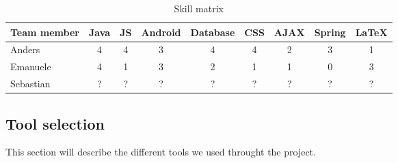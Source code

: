 \begin{table}[h]
\begin{center}
\begin{tabular}{ | l | c | c | c | c | c | c | c | c | }
  \hline
  Team member & Java & JS & Android & Database & CSS & AJAX & Spring & LaTeX \\
  \hline\noalign{\smallskip}\noalign{\smallskip}\hline
  Anders & 4 & 4 & 3 & 4 & 4 & 2 & 3 & 1 \\
  Emanuele & 4 & 1 & 3 & 2 & 1 & 1 & 0 & 3 \\
  Sebastian & ? & ? & ? & ? & ? & ? & ? & ? \\
  \hline
\end{tabular}
\end{center}
\caption{Skill matrix}
\label{table:skillmatrix}
\end{table}

\subsection{Tool selection}
This section will describe the different tools we used throught the project.



